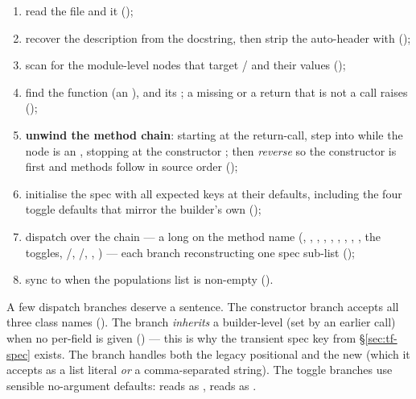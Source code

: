 \begin{enumerate}
  \item read the file and  it ();
  \item recover the description from the docstring, then strip the auto-header
        with  ();
  \item scan  for the module-level  nodes that
        target  /  and
         their values ();
  \item find the  function (an ), and its
        ; a missing  or a return that is not a call
        raises  ();
  \item \textbf{unwind the method chain}: starting at the return-call, step into
         while the node is an , stopping at
        the constructor ; then \emph{reverse} so the constructor is
        first and methods follow in source order ();
  \item initialise the spec with all expected keys at their defaults, including
        the four toggle defaults that mirror the builder's own
        ();
  \item dispatch over the chain --- a long  on the method name
        (, , ,
        , , ,
        , , , the
        toggles, /, /,
        , ) --- each branch reconstructing
        one spec sub-list ();
  \item sync  to  when the populations
        list is non-empty ().
\end{enumerate}

A few dispatch branches deserve a sentence. The constructor branch accepts all
three class names (). The  branch
\emph{inherits} a builder-level  (set by an earlier
 call) when no per-field  is given
() --- this is why the transient spec key from
\S\ref{sec:tf-spec} exists. The  branch handles both the
legacy positional  and the new  (which
it accepts as a list literal \emph{or} a comma-separated string). The toggle
branches use sensible no-argument defaults:  reads as
,  reads as .

